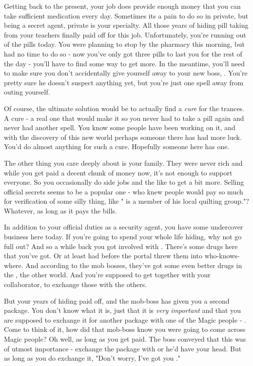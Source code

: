 \documentclass[char]{guildcamp3}
\begin{document}
Getting back to the present, your job does provide enough money that you can take sufficient medication every day. Sometimes its a pain to do so in private, but being a secret agent, private is your specialty. All those years of hiding pill taking from your teachers finally paid off for this job. Unfortunately, you're running out of the pills today. You were planning to stop by the pharmacy this morning, but had no time to do so - now you've only got three pills to last you for the rest of the day - you'll have to find some way to get more. In the meantime, you'll need to make sure you don't accidentally give yourself away to your new boss, \cSpecOpOne{}. You're pretty sure he doesn't suspect anything yet, but you're just one spell away from outing yourself. 

Of course, the ultimate solution would be to actually find a \emph{cure} for the trances. A cure - a real one that would make it so you never had to take a pill again and never had another spell. You know some people have been working on it, and with the discovery of this new world perhaps someone there has had more luck. You'd do almost anything for such a cure. Hopefully someone here has one.  

The other thing you care deeply about is your family. They were never rich and while you get paid a decent chunk of money now, it's not enough to support everyone. So you occasionally do side jobs and the like to get a bit more. Selling official secrets seems to be a popular one - who knew people would pay so much for verification of some silly thing, like "\cPoliOne{} is a member of his local quilting group."? Whatever, as long as it pays the bills. 

In addition to your official duties as a security agent, you have some undercover business here today. If you're going to spend your whole life hiding, why not go full out? And so a while back you got involved with \bTechMob{}. There's some drugs here that you've got. Or at least had before the portal threw them into who-knows-where. And according to the mob bosses, they've got some even better drugs in the \bMagicWorld{}, the other world. And you're supposed to get together with your collaborator, \cPoliTwo{\informal} to exchange those with the others. 

But your years of hiding paid off, and the mob-boss has given you a second package. You don't know what it is, just that it is \emph{very important} and that you are supposed to exchange it for another package with one of the Magic people - \cServant{\intro}. Come to think of it, how did that mob-boss know you were going to come across Magic people? Oh well, as long as you get paid. The boss conveyed that this was of utmost importance - exchange the package with \cServant{} or he'd have your head. But as long as you do exchange it, "Don't worry, I've got you \cSpecOpTwo{\informal}." 
\end{document}
